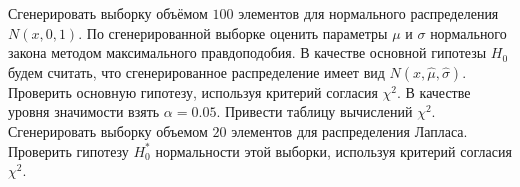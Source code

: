\documentclass[../body.tex]{subfiles}
\begin{document}
	Сгенерировать выборку объёмом $100$ элементов для нормального распределения $N(x,0,1).$ По сгенерированной выборке оценить параметры $\mu$ и $\sigma$ нормального закона методом максимального правдоподобия. В качестве основной гипотезы $H_{0}$ будем считать, что сгенерированное распределение имеет вид $N(x,\hat{\mu}, \hat{\sigma})$. Проверить основную гипотезу, используя критерий согласия $\chi^{2}$. В качестве уровня значимости взять $\alpha = 0.05$. Привести таблицу вычислений $\chi^{2}$. \\
	Сгенерировать выборку объемом $20$ элементов для распределения Лапласа. Проверить гипотезу $H_0^*$ нормальности этой выборки, используя критерий согласия $\chi^{2}$.
	
\end{document}
